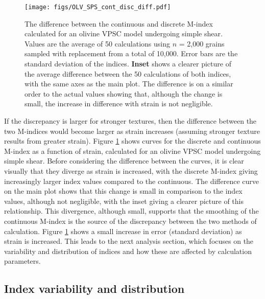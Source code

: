 \documentclass[a4paper,12pt]{report}
\numberwithin{equation}{chapter}
\begin{document}
\begin{figure}[h]
  \centering
    \texttt{[image: figs/OLV\_SPS\_cont\_disc\_diff.pdf]}
  \caption[Discrete and continuous M-index difference (olivine VPSC)]{The difference between the continuous and discrete M-index calculated for an olivine VPSC model undergoing simple shear. Values are the average of 50 calculations using $n$ = 2,000 grains sampled with replacement from a total of 10,000. Error bars are the standard deviation of the indices. \textbf{Inset} shows a clearer picture of the average difference between the 50 calculations of both indices, with the same axes as the main plot. The difference is on a similar order to the actual values showing that, although the change is small, the increase in difference with strain is not negligible.}
  \label{fig:OLV_SPS_cont_disc_diff}
\end{figure}  

If the discrepancy is larger for stronger textures, then the difference between the two M-indices would become larger as strain increases (assuming stronger texture results from greater strain). Figure \ref{fig:OLV_SPS_cont_disc_diff} shows curves for the discrete and continuous M-index as a function of strain, calculated for an olivine VPSC model undergoing simple shear. Before considering the difference between the curves, it is clear visually that they diverge as strain is increased, with the discrete M-index giving increasingly larger index values compared to the continuous. The difference curve on the main plot shows that this change is small in comparison to the index values, although not negligible, with the inset giving a clearer picture of this relationship. This divergence, although small, supports that the smoothing of the continuous M-index is the source of the discrepancy between the two methods of calculation. Figure \ref{fig:OLV_SPS_cont_disc_diff} shows a small increase in error (standard deviation) as strain is increased. This leads to the next analysis section, which focuses on the variability and distribution of indices and how these are affected by calculation parameters.     

\subsection{Index variability and distribution}
\end{document}
